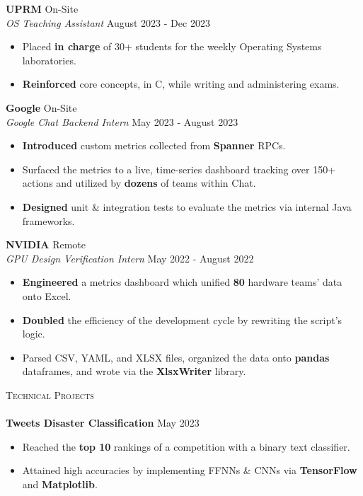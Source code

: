 \documentclass[a4paper]{article}
\newcommand{\lineunder} {
    \vspace*{-8pt} \\
    \hspace*{-18pt} \hrulefill \\
}
\newcommand{\header} [1] {
    {\hspace*{-18pt}\vspace*{6pt} \textsc{#1}}
    \vspace*{-6pt} \lineunder
}
\begin{document}
\textbf{UPRM} \hfill On-Site\\
\textit{OS Teaching Assistant} \hfill August 2023 - Dec 2023 \\
\vspace{-2mm}
\begin{itemize} \itemsep -1pt
	\item Placed \textbf{in charge} of 30+ students for the weekly Operating Systems laboratories.
	\item \textbf{Reinforced} core concepts, in C, while writing and administering exams.
\end{itemize}
\vspace{-2mm}

\textbf{Google} \hfill On-Site\\
\textit{Google Chat Backend Intern} \hfill May 2023 - August 2023\\
\vspace{-2mm}
\begin{itemize} \itemsep -1pt
	\item \textbf{Introduced} custom metrics collected from \textbf{Spanner} RPCs.
	\item Surfaced the metrics to a live, time-series dashboard tracking over 150+ actions and utilized by \textbf{dozens} of teams within Chat.
	\item \textbf{Designed} unit \& integration tests to evaluate the metrics via internal Java frameworks.
\end{itemize}
\vspace{-2mm}

\textbf{NVIDIA} \hfill Remote\\
\textit{GPU Design Verification Intern} \hfill May 2022 - August 2022\\
\vspace{-2mm}
\begin{itemize} \itemsep -1pt
	\item \textbf{Engineered} a metrics dashboard which unified \textbf{80} hardware teams' data onto Excel.
	\item \textbf{Doubled} the efficiency of the development cycle by rewriting the script's logic. 
	\item Parsed CSV, YAML, and XLSX files, organized the data onto \textbf{pandas} dataframes, and wrote via the \textbf{XlsxWriter} library. 
\end{itemize}
\vspace{-2mm}


\header{Technical Projects}
{\textbf{Tweets Disaster Classification}} \hfill May 2023 \\
\vspace{-2mm}
\begin{itemize} \itemsep -1pt
\item Reached the \textbf{top 10} rankings of a competition with a binary text classifier. 

\item Attained high accuracies by implementing FFNNs \& CNNs via \textbf{TensorFlow} and \textbf{Matplotlib}.
\end{itemize}
\vspace{-2mm}
\end{document}
